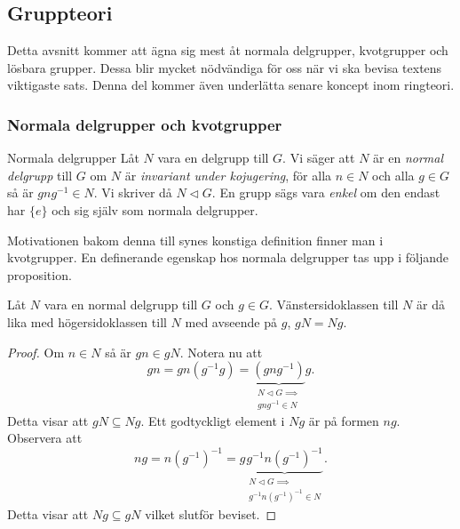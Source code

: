 \documentclass{article}
\theoremstyle{definition}
\begin{document}
\subsection{Gruppteori}
Detta avsnitt kommer att ägna sig mest åt normala delgrupper, kvotgrupper och lösbara grupper. 
Dessa blir mycket nödvändiga för oss när vi ska bevisa textens viktigaste sats. 
Denna del kommer även underlätta senare koncept inom ringteori.

\subsubsection{Normala delgrupper och kvotgrupper}
\begin{mydef}{Normala delgrupper}{}
  Låt $N$ vara en delgrupp till $G$. Vi säger att $N$ är 
  en \textit{normal delgrupp} till $G$ om $N$ är 
  \textit{invariant under kojugering}, för alla $n \in N$ och 
  alla $g \in G$ så är $gng^{-1} \in N$. Vi skriver då $N \triangleleft G.$ En grupp sägs vara \textit{enkel} om 
  den endast har $\{e\}$ och sig själv som normala delgrupper.
\end{mydef}
Motivationen bakom denna till synes konstiga definition finner man i kvotgrupper. 
En definerande egenskap hos normala delgrupper tas upp i följande proposition.

\hypertarget{prop1}{}
\begin{myprop}{}{}
  Låt $N$ vara en normal delgrupp till $G$ och $g \in G$. Vänstersidoklassen till $N$ är då lika med högersidoklassen till $N$ med avseende på $g$, 
  $gN = Ng.$
\end{myprop}

\begin{proof}
  Om $n \in N$ så är $gn \in gN$. Notera nu att 
  \begin{equation*}
    gn = gn(g^{-1}g) = \underbrace{(gng^{-1})}_{ \substack{N \triangleleft G  \implies \\ gng^{-1} \in N}} g.
  \end{equation*}
  Detta visar att $gN \subseteq Ng.$ Ett godtyckligt element i $Ng$ är på formen $ng$. Observera att 
  \begin{equation*}
    ng = n(g^{-1})^{-1} = g \underbrace{g^{-1} {n(g^{-1})^{-1}}}_{\substack{N \triangleleft G  \implies \\ g^{-1} {n(g^{-1})^{-1} \in N}}}.
  \end{equation*}
  Detta visar att $Ng \subseteq gN$ vilket slutför beviset.
\end{proof}
\end{document}
